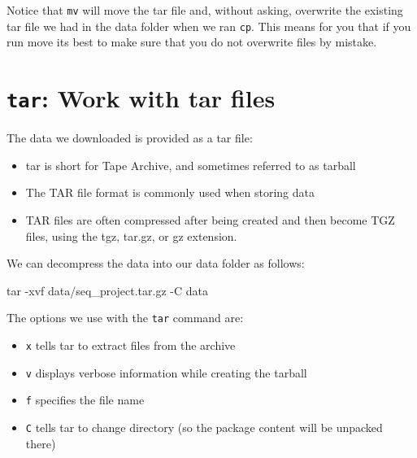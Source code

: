 \documentclass[
  letterpaper,
  DIV=11,
  numbers=noendperiod]{scrreprt}
\newenvironment{Shaded}{}{}
\newcommand{\AttributeTok}[1]{\textcolor[rgb]{0.84,0.23,0.29}{#1}}
\newcommand{\FunctionTok}[1]{\textcolor[rgb]{0.44,0.26,0.76}{#1}}
\newcommand{\NormalTok}[1]{\textcolor[rgb]{0.14,0.16,0.18}{#1}}
\providecommand{\tightlist}{%
  \setlength{\itemsep}{0pt}\setlength{\parskip}{0pt}}\usepackage{longtable,booktabs,array}
\begin{document}
Notice that \texttt{mv} will move the tar file and, without asking,
overwrite the existing tar file we had in the data folder when we ran
\texttt{cp}. This means for you that if you run move its best to make
sure that you do not overwrite files by mistake.

\section{\texorpdfstring{\texttt{tar}: Work with tar
files}{tar: Work with tar files}}\label{tar-work-with-tar-files}

The data we downloaded is provided as a tar file:

\begin{itemize}
\tightlist
\item
  tar is short for Tape Archive, and sometimes referred to as tarball
\item
  The TAR file format is commonly used when storing data
\item
  TAR files are often compressed after being created and then become TGZ
  files, using the tgz, tar.gz, or gz extension.
\end{itemize}

We can decompress the data into our data folder as follows:

\begin{Shaded}
\begin{Highlighting}[]
\FunctionTok{tar} \AttributeTok{{-}xvf}\NormalTok{ data/seq\_project.tar.gz }\AttributeTok{{-}C}\NormalTok{ data}
\end{Highlighting}
\end{Shaded}

The options we use with the \texttt{tar} command are:

\begin{itemize}
\tightlist
\item
  \texttt{x} tells tar to extract files from the archive
\item
  \texttt{v} displays verbose information while creating the tarball
\item
  \texttt{f} specifies the file name
\item
  \texttt{C} tells tar to change directory (so the package content will
  be unpacked there)
\end{itemize}
\end{document}
